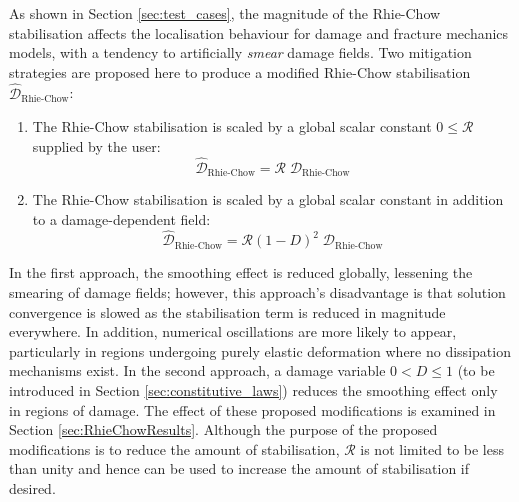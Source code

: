 \documentclass[sn-mathphys,Numbered]{sn-jnl}%
\begin{document}
As shown in Section \ref{sec:test_cases}, the magnitude of the Rhie-Chow stabilisation affects the localisation behaviour for damage and fracture mechanics models, with a tendency to artificially \emph{smear} damage fields.
Two mitigation strategies are proposed here to produce a modified Rhie-Chow stabilisation $\hat{\mathcal{D}}_{\text {Rhie-Chow}}$:
\begin{enumerate}[label=(\alph*)]
	\item The Rhie-Chow stabilisation is scaled by a global scalar constant $0 \leq \mathcal{R}$ supplied by the user:
	\begin{equation}
		\hat{\mathcal{D}}_{\text{Rhie-Chow}} = \mathcal{R} \; \mathcal{D}_{\text {Rhie-Chow}}
	\end{equation}
	\item The Rhie-Chow stabilisation is scaled by a global scalar constant in addition to a damage-dependent field:
	\begin{equation}
		\hat{\mathcal{D}}_{\text{Rhie-Chow}} = \mathcal{R} (1-D)^2 \; \mathcal{D}_{\text {Rhie-Chow}}
	\end{equation}
\end{enumerate}
In the first approach, the smoothing effect is reduced globally, lessening the smearing of damage fields; however, this approach's disadvantage is that solution convergence is slowed as the stabilisation term is reduced in magnitude everywhere.
In addition, numerical oscillations are more likely to appear, particularly in regions undergoing purely elastic deformation where no dissipation mechanisms exist.
In the second approach, a damage variable $0 < D \leq 1$ (to be introduced in Section \ref{sec:constitutive_laws}) reduces the smoothing effect only in regions of damage.
The effect of these proposed modifications is examined in Section \ref{sec:RhieChowResults}.
Although the purpose of the proposed modifications is to reduce the amount of stabilisation, $\mathcal{R}$ is not limited to be less than unity and hence can be used to increase the amount of stabilisation if desired.


\end{document}
